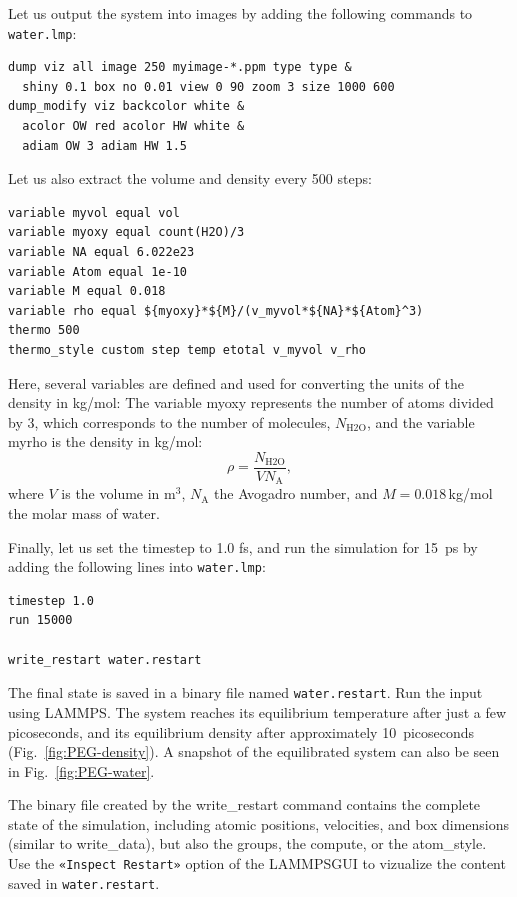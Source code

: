 \documentclass[9pt,tutorial]{livecoms}
\newcommand{\lmpcmd}[1]{\hspace{0pt}\colorbox{listing}{\textcolor{command}{\small{#1}}}\hspace{0pt}} %
\newcommand{\lmpcmdnote}[1]{\hspace{0pt}\colorbox{note_listing}{\textcolor{command}{\small{#1}}}\hspace{0pt}} %
\newcommand{\flecmd}[1]{\textcolor{command}{\texttt{#1}}} %
\newcommand{\guicmd}[1]{\textcolor{command}{\texttt{«#1»}}} %
\newcommand{\lammpsgui}{\textsf{LAMMPS\textendash GUI}}
\begin{document}
Let us output the system into images by adding the following commands to \flecmd{water.lmp}:
\begin{lstlisting}
dump viz all image 250 myimage-*.ppm type type &
  shiny 0.1 box no 0.01 view 0 90 zoom 3 size 1000 600
dump_modify viz backcolor white &
  acolor OW red acolor HW white &
  adiam OW 3 adiam HW 1.5
\end{lstlisting}
Let us also extract the volume and density every 500 steps:
\begin{lstlisting}
variable myvol equal vol
variable myoxy equal count(H2O)/3
variable NA equal 6.022e23
variable Atom equal 1e-10
variable M equal 0.018
variable rho equal ${myoxy}*${M}/(v_myvol*${NA}*${Atom}^3)
thermo 500
thermo_style custom step temp etotal v_myvol v_rho
\end{lstlisting}
Here, several variables are defined and used for converting the units of the
density in kg/mol:  The variable \lmpcmd{myoxy} represents the number of
atoms divided by 3,  which corresponds to the number of molecules, $N_\text{H2O}$,
and the variable \lmpcmd{myrho} is the density in kg/mol:
\begin{equation}
\rho = \dfrac{N_\text{H2O}}{V N_\text{A}},
\end{equation}
where $V$ is the volume in m$^3$, $N_\text{A}$ the Avogadro number, and
$M = 0.018$\,kg/mol the molar mass of water.

Finally, let us set the timestep to 1.0 fs, and run the simulation for 15~ps by
adding the following lines into \flecmd{water.lmp}:
\begin{lstlisting}
timestep 1.0
run 15000

write_restart water.restart
\end{lstlisting}
The final state is saved in a binary file named \flecmd{water.restart}.
Run the input using LAMMPS.  The system reaches its equilibrium temperature
after just a few picoseconds, and its equilibrium density after approximately
10~picoseconds (Fig.~\ref{fig:PEG-density}).  A snapshot of the equilibrated
system can also be seen in Fig.~\ref{fig:PEG-water}.

\begin{note}
The binary file created by the \lmpcmdnote{write\_restart} command contains the
complete state of the simulation, including atomic positions, velocities, and
box dimensions (similar to \lmpcmdnote{write\_data}), but also the groups,
the compute, or the \lmpcmdnote{atom\_style}.  Use the \guicmd{Inspect Restart}
option of the \lammpsgui{} to vizualize the content saved in \flecmd{water.restart}.
\end{note}
\end{document}
